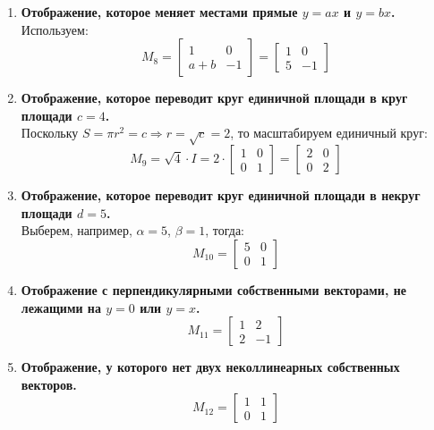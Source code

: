 \begin{enumerate}
  \item \textbf{Отображение, которое меняет местами прямые $y = ax$ и $y = bx$.}\\
  Используем:
  \[
    M_8 = \begin{bmatrix}
      1 & 0 \\
      a + b & -1
    \end{bmatrix} =
    \begin{bmatrix}
      1 & 0 \\
      5 & -1
    \end{bmatrix}
  \]

  \item \textbf{Отображение, которое переводит круг единичной площади в круг площади $c = 4$.}\\
  Поскольку $S = \pi r^2 = c \Rightarrow r = \sqrt{c} = 2$, то масштабируем единичный круг:
  \[
    M_9 = \sqrt{4} \cdot I = 2 \cdot
    \begin{bmatrix}
      1 & 0 \\
      0 & 1
    \end{bmatrix} =
    \begin{bmatrix}
      2 & 0 \\
      0 & 2
    \end{bmatrix}
  \]

  \item \textbf{Отображение, которое переводит круг единичной площади в некруг площади $d = 5$.}\\
  Выберем, например, $\alpha = 5$, $\beta = 1$, тогда:
  \[
    M_{10} = \begin{bmatrix}
      5 & 0 \\
      0 & 1
    \end{bmatrix}
  \]

  \item \textbf{Отображение с перпендикулярными собственными векторами, не лежащими на $y = 0$ или $y = x$.}\\
  \[
    M_{11} = \begin{bmatrix}
      1 & 2 \\
      2 & -1
    \end{bmatrix}
  \]

  \item \textbf{Отображение, у которого нет двух неколлинеарных собственных векторов.}\\
  \[
    M_{12} = \begin{bmatrix}
      1 & 1 \\
      0 & 1
    \end{bmatrix}
  \]


\end{enumerate}
